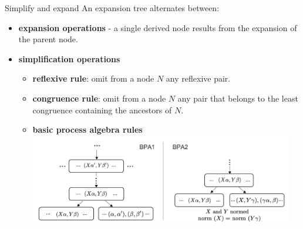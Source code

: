 \documentclass[10pt]{beamer}
\begin{document}
\begin{frame} {Simplify and expand}
	An expansion tree alternates between:
	\vspace*{-1mm}
	\begin{itemize} 
		\item {\color{mLightBrown} \bf expansion operations} - a single derived node results from the expansion of the parent node. \pause
		\item {\color{teal}\bf simplification operations	}
		\begin{itemize}
			\item {\bf reflexive rule}: omit from a node $N$ any reflexive pair.
			\item {\bf congruence rule}: omit from a node $N$ any pair that belongs to the least congruence containing the ancestors of $N$. \pause
			\item {\bf basic process algebra rules}\\
			\vspace*{-2mm}
			\hspace*{-2cm}\includegraphics[height=4cm]{img/bpa_new}\smallskip
		\end{itemize}
	\end{itemize}
\end{frame}


	
	
\end{document}
